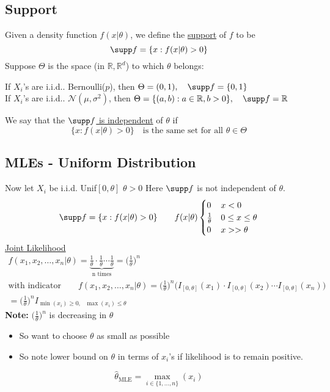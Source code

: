 \subsection*{Support}
Given a density function $f(x|\theta)$, we define the \underline{support} of $f$ to be
\begin{equation*}
	\supp f = \{x : f(x|\theta) > 0 \}
\end{equation*}
Suppose $\Theta$ is the space (in $\mathbb{R}, \mathbb{R}^d$) to which $\theta$ belongs:
\begin{center}
	If $X_i$'s are i.i.d.. Bernoulli($p$), then $\Theta = (0,1),  \quad \supp f = \{0,1 \}$\\
	If $X_i$'s are i.i.d.. $\mathcal{N}(\mu, \sigma^2)$, then $\Theta = \{(a,b) : a \in \mathbb{R}, b > 0  \}, \quad \supp f = \mathbb{R}$\\
\end{center}
We say that the \underline{$\supp f$ is independent} of $\theta$ if
\begin{equation*}
	\{x : f(x | \theta) > 0 \} \quad \text{is the same set for all $\theta \in \Theta$}
\end{equation*}
\subsection*{MLEs - Uniform Distribution}
Now let $X_i$ be i.i.d. Unif$[0,\theta]$ \qquad $\theta > 0$ \qquad Here $\supp f$ is not independent of $\theta$.
\begin{equation*}
	\supp f = \{x: f(x | \theta) > 0 \} \qquad f(x|\theta) \begin{cases}
		0 & x < 0\\
		\frac{1}{\theta} & 0 \leq x \leq \theta\\
		0 & x >> \theta
	\end{cases}
\end{equation*}
\underline{Joint Likelihood}
\begin{gather*}
f(x_1, x_2, \ldots, x_n | \theta) = \underbrace{\frac{1}{\theta} \cdot \frac{1}{\theta} \cdots \frac{1}{\theta}}_{\text{n times}} = \bigg( \frac{1}{\theta} \bigg)^n\\
\text{with indicator} \qquad f(x_1, x_2, \ldots, x_n | \theta) = \bigg( \frac{1}{\theta} \bigg)^n \bigg( I_{[0, \theta]}(x_1) \cdot I_{[0, \theta]}(x_2) \cdots I_{[0, \theta]}(x_n) \bigg)\\
= \bigg( \frac{1}{\theta} \bigg)^n I_{\min (x_i) \geq 0, \text{ } \max (x_i) \leq \theta}
\end{gather*}
\textbf{Note: } $\big( \frac{1}{\theta}\big)^n $ is decreasing in $\theta$
\begin{itemize}
	\item So want to choose $\theta$ as small as possible
	\item So note lower bound on $\theta$ in terms of $x_i$'s if likelihood is to remain positive.
\end{itemize}
\begin{equation*}
	\boxed{\hat{\theta}_{\text{MLE}} = \underset{i \in \{1, \ldots, n\}}{\max} (x_i)}
\end{equation*}
